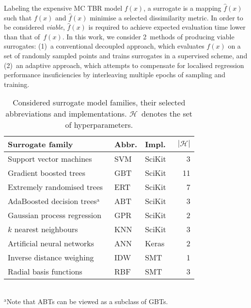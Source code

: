 Labeling the expensive MC TBR model $f(x)$, a surrogate is a mapping
$\hat{f}(x)$ such that $f(x)$ and $\hat{f}(x)$ minimise a selected dissimilarity
metric. In order to be considered \textit{viable}, $\hat{f}(x)$ is required to
achieve expected evaluation time lower than that of~$f(x)$. In this work, we
consider 2~methods of producing viable surrogates: (1)~a conventional decoupled
approach, which evaluates $f(x)$ on a set of randomly sampled points and
trains surrogates in a supervised scheme, and (2)~an adaptive approach, which attempts to
compensate for localised regression performance insuficiencies by interleaving
multiple epochs of sampling and training.

\begin{table}[t]
	\setlength\tabcolsep{2pt}
	\renewcommand{\arraystretch}{0.95}
	\caption{\label{tbl:surrogates}Considered surrogate model families, their
		selected abbreviations and implementations. $\mathcal{H}$~denotes the
		set of hyperparameters.}
	\begin{indented}
	\item[]
		\begin{tabular}{lllr}
		\toprule
		Surrogate family & Abbr. & Impl. & $|\mathcal{H}|$ \\
		\midrule
		Support vector machines~\cite{fan2008liblinear}	& SVM & SciKit~\cite{scikit-learn} & 3 \\
		Gradient boosted trees~\cite{friedman2001greedy,friedman1999stochastic,hastie2009elements}	& GBT & SciKit & 11 \\
		Extremely randomised trees~\cite{geurts2006extremely}	& ERT & SciKit & 7 \\
		AdaBoosted decision trees$^\text{a}$~\cite{drucker1997improving}	& ABT & SciKit & 3 \\
		Gaussian process regression~\cite{williams2006gaussian}	& GPR & SciKit & 2 \\
		$k$ nearest neighbours	& KNN & SciKit & 3 \\
		Artificial neural networks	& ANN & Keras~\cite{chollet2015keras} & 2 \\
		Inverse distance weighing~\cite{shepard1968two} & IDW & SMT~\cite{SMT2019} & 1 \\
		Radial basis functions & RBF & SMT & 3 \\
		\bottomrule
		\end{tabular}\\%
		{\footnotesize $^\text{a}$Note that ABTs can be viewed as a subclass of GBTs.}
	\end{indented}
\end{table}

